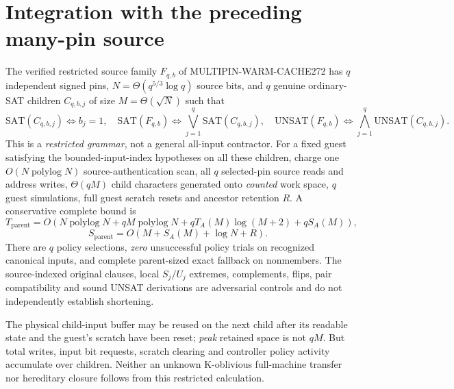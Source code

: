 \documentclass[11pt]{article}
\begin{document}
\section{Integration with the preceding many-pin source}
The verified restricted source family $F_{q,b}$ of MULTIPIN-WARM-CACHE272 has $q$ independent signed pins, $N=\Theta(q^{5/3}\log q)$ source bits, and $q$ genuine ordinary-SAT children $C_{q,b,j}$ of size $M=\Theta(\sqrt N)$ such that
\[
 \mathrm{SAT}(C_{q,b,j})\iff b_j=1,\quad
 \mathrm{SAT}(F_{q,b})\iff \bigvee_{j=1}^q\mathrm{SAT}(C_{q,b,j}),\quad
 \mathrm{UNSAT}(F_{q,b})\iff\bigwedge_{j=1}^q\mathrm{UNSAT}(C_{q,b,j}).
\]
This is a \emph{restricted grammar}, not a general all-input contractor. For a fixed guest satisfying the bounded-input-index hypotheses on all these children, charge one $O(N\operatorname{polylog}N)$ source-authentication scan, all $q$ selected-pin source reads and address writes, $\Theta(qM)$ child characters generated onto \emph{counted} work space, $q$ guest simulations, full guest scratch resets and ancestor retention $R$. A conservative complete bound is
\[
T_{\mathrm{parent}}=
O\!\left(N\operatorname{polylog}N+
qM\operatorname{polylog}N+
qT_A(M)\log(M+2)+qS_A(M)\right),
\]
\[
S_{\mathrm{parent}}=
O\!\left(M+S_A(M)+\log N+R\right).
\]
There are $q$ policy selections, \emph{zero} unsuccessful policy trials on recognized canonical inputs, and complete parent-sized exact fallback on nonmembers. The source-indexed original clauses, local $S_j/U_j$ extremes, complements, flips, pair compatibility and sound UNSAT derivations are adversarial controls and do not independently establish shortening.

The physical child-input buffer may be reused on the next child after its readable state and the guest's scratch have been reset; \emph{peak} retained space is not $qM$. But total writes, input bit requests, scratch clearing and controller policy activity accumulate over children. Neither an unknown K-oblivious full-machine transfer nor hereditary closure follows from this restricted calculation.
\end{document}
